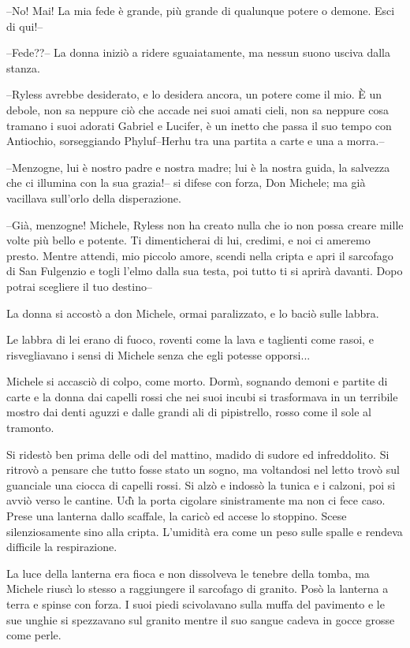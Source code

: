 \begin{racconto}
  --No! Mai! La mia fede \`e grande, pi\`u grande di qualunque
  potere o demone. Esci di qui!--
  
  --Fede??-- La donna inizi\`o a ridere sguaiatamente, ma nessun
  suono usciva dalla stanza.
  
  --Ryless avrebbe desiderato, e lo desidera ancora, un potere come il
  mio.  \`E un debole, non sa neppure ci\`o che accade nei suoi amati
  cieli, non sa neppure cosa tramano i suoi adorati Gabriel e Lucifer,
  \`e un inetto che passa il suo tempo con Antiochio, sorseggiando 
  Phyluf--Herhu tra una partita a carte e una a morra.--
  
  --Menzogne, lui \`e nostro padre e nostra madre; lui \`e la
  nostra guida, la salvezza che ci illumina con la sua grazia!-- si
  difese con forza, Don Michele; ma gi\`a vacillava sull'orlo della
  disperazione.
  
  --Gi\`a, menzogne! Michele, Ryless non ha creato nulla che io non
  possa creare mille volte pi\`u bello e potente. Ti dimenticherai
  di lui, credimi, e noi ci ameremo presto. Mentre attendi, mio
  piccolo amore, scendi nella cripta e apri il sarcofago di San
  Fulgenzio e togli l'elmo dalla sua testa, poi tutto ti si aprir\`a
  davanti. Dopo potrai scegliere il tuo destino--
  
  La donna si accost\`o a don Michele, ormai paralizzato, e lo
  baci\`o sulle labbra.
  
  Le labbra di lei erano di fuoco, roventi come la lava e taglienti
  come rasoi, e risvegliavano i sensi di Michele senza che egli
  potesse opporsi...
  
  Michele si accasci\`o di colpo, come morto. Dorm\`{\i}, sognando
  demoni e partite di carte e la donna dai capelli rossi che nei suoi
  incubi si trasformava in un terribile mostro dai denti aguzzi e
  dalle grandi ali di pipistrello, rosso come il sole al tramonto.
  
  Si ridest\`o ben prima delle odi del mattino, madido di sudore ed
  infreddolito.  Si ritrov\`o a pensare che tutto fosse stato un
  sogno, ma voltandosi nel letto trov\`o sul guanciale una ciocca di
  capelli rossi. Si alz\`o e indoss\`o la tunica e i calzoni, poi
  si avvi\`o verso le cantine. Ud\`{\i} la porta cigolare sinistramente
  ma non ci fece caso. Prese una lanterna dallo scaffale, la
  caric\`o ed accese lo stoppino. Scese silenziosamente sino alla
  cripta. L'umidit\`a era come un peso sulle spalle e rendeva
  difficile la respirazione.
  
  La luce della lanterna era fioca e non dissolveva le tenebre della
  tomba, ma Michele riusc\`{\i} lo stesso a raggiungere il sarcofago
  di granito. Pos\`o la lanterna a terra e spinse con forza. I suoi
  piedi scivolavano sulla muffa del pavimento e le sue unghie si
  spezzavano sul granito mentre il suo sangue cadeva in gocce grosse
  come perle.
  

\end{racconto}
